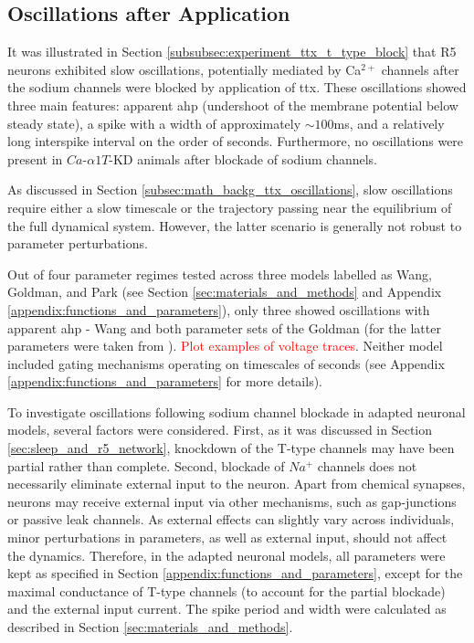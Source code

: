 \documentclass[../main.tex]{subfiles}
\begin{document}
\subsection{Oscillations after  Application}

\noindent It was illustrated in Section \ref{subsubsec:experiment_ttx_t_type_block} that R5 neurons exhibited slow oscillations, potentially mediated by Ca$^{2+}$ channels after the sodium channels were blocked by application of \gls{ttx}. These oscillations showed three main features: apparent \gls{ahp} (undershoot of the membrane potential below steady state), a spike with a width of approximately $\sim 100$ms, and a relatively long interspike interval on the order of seconds.
Furthermore, no oscillations were present in $Ca$-$\alpha 1T$-KD animals after blockade of sodium channels.

As discussed in Section \ref{subsec:math_backg_ttx_oscillations}, slow oscillations require either a slow timescale or the trajectory passing near the equilibrium of the full dynamical system. However, the latter scenario is generally not robust to parameter perturbations.

Out of four parameter regimes tested across three models labelled as Wang, Goldman, and Park (see Section \ref{sec:materials_and_methods} and Appendix \ref{appendix:functions_and_parameters}), only three showed oscillations with apparent \gls{ahp} - Wang \parencite{wangMultipleDynamicalModes1994} and both parameter sets of the Goldman \parencite{goldmanGlobalStructureRobustness2001} (for the latter parameters were taken from \parencite{franciRobustTunableBursting2018}). \textcolor{red}{Plot examples of voltage traces}. Neither model included gating mechanisms operating on timescales of seconds (see Appendix \ref{appendix:functions_and_parameters} for more details). 

To investigate oscillations following sodium channel blockade in adapted neuronal models, several factors were considered. First, as it was discussed in Section \ref{sec:sleep_and_r5_network}, knockdown of the T-type channels may have been partial rather than complete. Second, blockade of $Na^+$ channels does not necessarily eliminate external input to the neuron. Apart from chemical synapses, neurons may receive external input via other mechanisms, such as gap-junctions or passive leak channels. As external effects can slightly vary across individuals, minor perturbations in parameters, as well as external input, should not affect the dynamics.
Therefore, in the adapted neuronal models, all parameters were kept as specified in Section \ref{appendix:functions_and_parameters}, except for the maximal conductance of T-type channels (to account for the partial blockade) and the external input current. The spike period and width were calculated as described in Section \ref{sec:materials_and_methods}.
\end{document}
